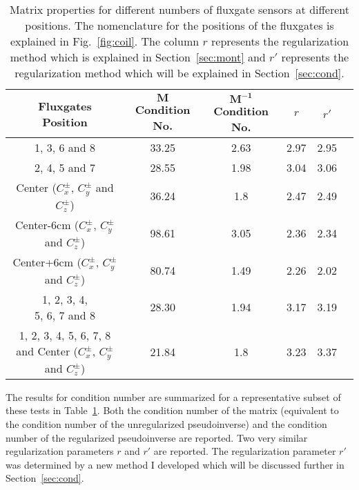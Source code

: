 \begin{table}%
    \centering
    \begin{tabular} { |c|c|c|c|c|c|} 
        \hline
        \makecell{Fluxgates \\Position} & \makecell{$\bm{M}$\\ Condition No.} &\makecell{$\bm{M^{-1}}$\\ Condition No.} & $r$ & $r'$\\
        \hline\hline
        1, 3, 6 and 8 & 33.25 & 2.63 & 2.97 & 2.95\\ 
        \hline
        2, 4, 5 and 7 & 28.55 & 1.98 & 3.04 & 3.06 \\ 
        \hline
        \makecell{Center \\($C_x^\pm$, $C_y^\pm$ and $C_z^\pm$)} & 36.24 & 1.8 & 2.47 & 2.49 \\ 
        \hline
        \makecell{Center-6cm \\($C_x^\pm$, $C_y^\pm$ and $C_z^\pm$)} & 98.61 & 3.05 & 2.36 & 2.34 \\ 
        \hline
        \makecell{Center+6cm \\($C_x^\pm$, $C_y^\pm$ and $C_z^\pm$)} & 80.74 & 1.49 & 2.26 & 2.02 \\ 
        \hline
        \makecell{1, 2, 3, 4, \\5, 6, 7 and 8} & 28.30 & 1.94 & 3.17 & 3.19 \\ 
        \hline
        \makecell{1, 2, 3, 4, \\5, 6, 7, 8 and \\Center ($C_x^\pm$, $C_y^\pm$ and $C_z^\pm$)}  & 21.84 & 1.8 & 3.23 & 3.37 \\ 
        \hline

    \end{tabular}\caption[Matrix properties for different numbers of
   fluxgate sensors at different positions.]{Matrix properties for
   different numbers of fluxgate sensors at different positions.  The
   nomenclature for the positions of the fluxgates is explained in
   Fig.~\ref{fig:coil}.  The column $r$ represents the regularization
   method which is explained in Section~\ref{sec:mont} and $r'$
   represents the regularization method which will be explained in
   Section~\ref{sec:cond}.}\label{table:flux-pos}
\end{table}

The results for condition number are summarized for a representative
subset of these tests in Table~\ref{table:flux-pos}.  Both the
condition number of the matrix (equivalent to the condition number of
the unregularized pseudoinverse) and the condition number of the
regularized pseudoinverse are reported.  Two very similar
regularization parameters $r$ and $r'$ are reported.  The
regularization parameter $r'$ was determined by a new method I
developed which will be discussed further in
Section~\ref{sec:cond}.

